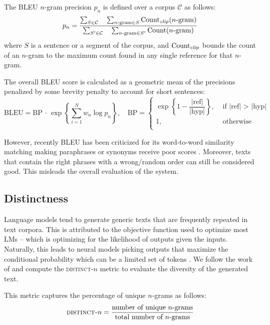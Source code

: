 The BLEU $n$-gram precision $p_n$ is defined over a corpus $\mathcal{C}$ as follows:
\[ p_n = \dfrac
{\sum_{S \in \mathcal{C}} \quad \sum_{n\text{-gram} \in S} \text{Count}_\text{\textit{clip}}(n\text{-gram})}
{\sum_{S' \in \mathcal{C}} \quad \sum_{n\text{-gram} \in S'} \text{Count}(n\text{-gram})}
\]
where $S$ is a sentence or a segment of the corpus, and $\text{Count}_\text{\textit{clip}}$ bounds the count of an $n$-gram to the maximum count found in any single reference for that $n$-gram.

The overall BLEU score is calculated as a geometric mean of the precisions penalized by some brevity penalty to account for short sentences:
\[ \text{BLEU} = \text{BP} \,\cdot\, \exp\left\{ \sum_{i=1}^{N} w_n \log p_n \right\}, \quad
\text{BP} =  \begin{cases}
	\exp\left\{ 1 - \dfrac{|\text{ref}|} { |\text{hyp}| }\right\}, & \text{ if |ref| > |hyp| } \\
	1, & \text{ otherwise } \\
\end{cases}
\]

However, recently BLEU has been criticized for its word-to-word similarity matching making paraphrases or synonyms receive poor scores \citep{callison2006re, cifka2018bleu, mathur2020tangled}. Moreover, texts that contain the right phrases with a wrong/random order can still be considered good. This misleads the overall evaluation of the system. %


\subsection{Distinctness}
\label{sec:diversity}

Language models tend to generate generic texts that are frequently repeated in text corpora. This is attributed to the objective function used to optimize most LMs -- which is optimizing for the likelihood of outputs given the inputs. Naturally, this leads to neural models picking outputs that maximize the conditional probability which can be a limited set of tokens \citep{li2015diversity}. We follow the work of \citep{li2015diversity} and compute the \textsc{distinct}-$n$ metric to evaluate the diversity of the generated text.

This metric captures the percentage of unique $n$-grams as follows:
\[ \textsc{distinct-}n = \frac{\text{number of unique $n$-grams}}{\text{total number of $n$-grams}} \]


